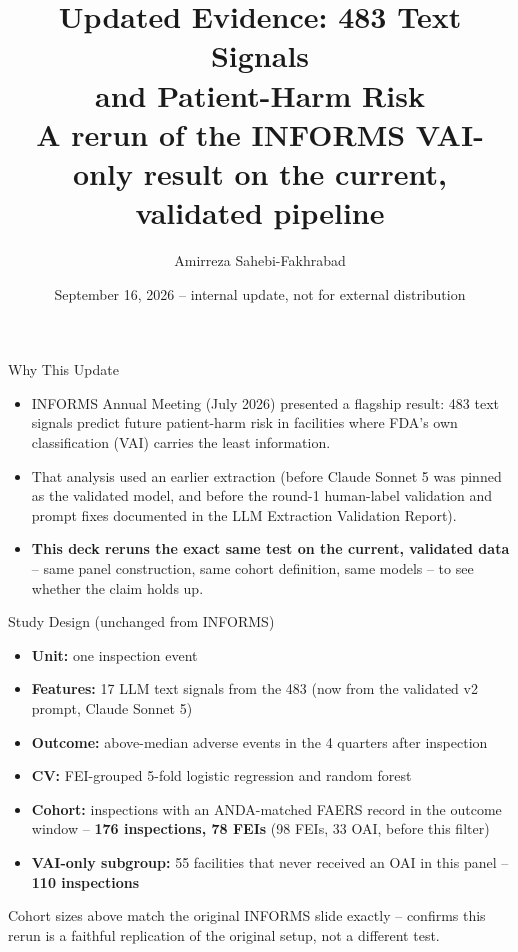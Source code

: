 \documentclass[aspectratio=169,10pt]{beamer}
\title[Updated Text-Signal Evidence]{%
  Updated Evidence: 483 Text Signals\texorpdfstring{\\}{ }
  and Patient-Harm Risk\texorpdfstring{\\}{ }
  \small A rerun of the INFORMS VAI-only result on the current, validated pipeline}
\author[Sahebi-Fakhrabad et al.]{Amirreza Sahebi-Fakhrabad}
\date{September 16, 2026 -- internal update, not for external distribution}
\newcommand{\highlight}[1]{{\color{ncsuRed}\textbf{#1}}}
\begin{document}
\begin{frame}
\titlepage
\end{frame}

\begin{frame}{Why This Update}
\begin{itemize}
  \setlength{\itemsep}{10pt}
  \item INFORMS Annual Meeting (July 2026) presented a flagship result: 483 text signals
        predict future patient-harm risk in facilities where FDA's own classification (VAI)
        carries the least information.
  \item That analysis used an earlier extraction (before Claude Sonnet 5 was pinned as the
        validated model, and before the round-1 human-label validation and prompt fixes
        documented in the LLM Extraction Validation Report).
  \item \highlight{This deck reruns the exact same test on the current, validated data} --
        same panel construction, same cohort definition, same models -- to see whether the
        claim holds up.
\end{itemize}
\end{frame}

\begin{frame}{Study Design (unchanged from INFORMS)}
\begin{itemize}
  \setlength{\itemsep}{8pt}
  \item \textbf{Unit:} one inspection event
  \item \textbf{Features:} 17 LLM text signals from the 483 (now from the validated v2 prompt,
        Claude Sonnet 5)
  \item \textbf{Outcome:} above-median adverse events in the 4 quarters after inspection
  \item \textbf{CV:} FEI-grouped 5-fold logistic regression and random forest
  \item \textbf{Cohort:} inspections with an ANDA-matched FAERS record in the outcome window --
        \highlight{176 inspections, 78 FEIs} (98 FEIs, 33 OAI, before this filter)
  \item \textbf{VAI-only subgroup:} 55 facilities that never received an OAI in this panel --
        \highlight{110 inspections}
\end{itemize}
\vspace{6pt}
{\small Cohort sizes above match the original INFORMS slide exactly -- confirms this rerun is a
faithful replication of the original setup, not a different test.}
\end{frame}
\end{document}
